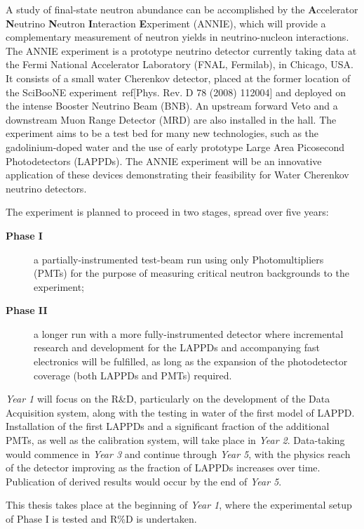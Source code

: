  A study of final-state neutron abundance can be accomplished by the %
 \textbf{A}ccelerator \textbf{N}eutrino \textbf{N}eutron \textbf{I}nteraction \textbf{E}xperiment %
 (ANNIE), which will provide a complementary measurement of neutron yields in %
 neutrino-nucleon interactions.
 The ANNIE experiment is a prototype neutrino detector currently taking data at the %
 Fermi National Accelerator Laboratory (FNAL, Fermilab), in Chicago, USA.
 It consists of a small water Cherenkov detector, placed at the former location of %
 the SciBooNE experiment~ref[Phys. Rev. D 78 (2008) 112004] and %
 deployed on the intense Booster Neutrino Beam (BNB).
 An upstream forward Veto and a downstream Muon Range Detector (MRD) are also installed %
 in the hall.
 The experiment aims to be a test bed for many new technologies, such as the gadolinium-doped water %
 and the use of early prototype Large Area Picosecond Photodetectors (LAPPDs).
 The ANNIE experiment will be an innovative application of these devices demonstrating %
 their feasibility for Water Cherenkov neutrino detectors.
 
 The experiment is planned to proceed in two stages, spread over five years:
 \begin{description}
   \item[\bfseries Phase I] a partially-instrumented test-beam run using only Photomultipliers %
     (PMTs) for the purpose of measuring critical neutron backgrounds to the experiment;
   \item[\bfseries Phase II] a longer run with a more fully-instrumented detector %
     where incremental research and development for the LAPPDs and %
     accompanying fast electronics will be fulfilled, as long as the expansion of the %
     photodetector coverage (both LAPPDs and PMTs) required.
 \end{description}

 \emph{Year 1} will focus on the R\&D, particularly on the development of the Data Acquisition %
 system, along with the testing in water of the first model of LAPPD. 
 Installation of the first LAPPDs and a significant fraction of the additional PMTs, as %
 well as the calibration system, will take place in \emph{Year 2}.
 Data-taking would commence in \emph{Year 3} and continue through \emph{Year 5}, %
 with the physics reach of the detector improving as the fraction of LAPPDs increases over time.
 Publication of derived results would occur by the end of \emph{Year 5}.
 
 This thesis takes place at the beginning of \emph{Year 1}, where the experimental setup of Phase I %
 is tested and R\%D is undertaken.

